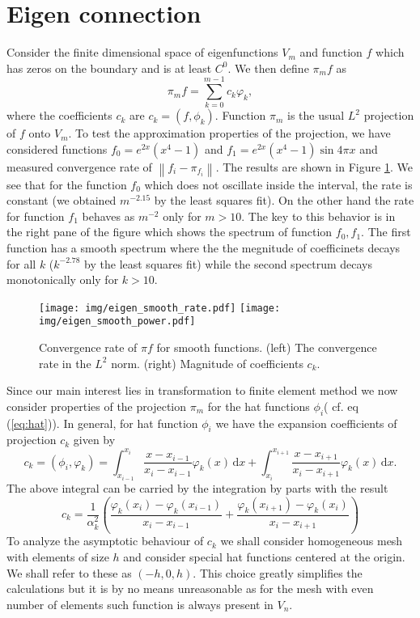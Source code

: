 \documentclass[a4paper,10pt]{article}
\newcommand{\norm}[1]{\ensuremath{\left\|#1\right\|}}
\newcommand{\inner}[2]{\ensuremath{\left(#1, #2\right)}}
\newcommand{\meas}[1]{\ensuremath{\,\mathrm{d}#1}}
\begin{document}
  \section{Eigen connection}
  Consider the finite dimensional space of eigenfunctions $V_m$ and function $f$
  which has zeros on the boundary and is at least $C^0$. We then define $\pi_m f$
  as
  \[
    \pi_m f = \displaystyle\sum\limits_{k=0}^{m-1}c_k \varphi_k,
  \]
  where the coefficients $c_k$ are $c_k=\inner{f}{\phi_k}$. Function $\pi_m$ is
  the usual $L^2$ projection of $f$ onto $V_m$. To test the approximation
  properties of the projection, we have considered functions
  $f_0=e^{2x}(x^4-1)$ and $f_1=e^{2x}(x^4-1)\sin{4\pi x}$ and measured
  convergence rate of $\norm{f_i - \pi_{f_i}}$. The results are shown in
  Figure \ref{fig:eig_smooth_projection}. We see that for the function $f_0$
  which does not oscillate inside the interval, the rate is constant (we
  obtained $m^{-2.15}$ by the least squares fit). On the other hand the rate
  for function $f_1$ behaves as $m^{-2}$ only for $m>10$. The key to this behavior
  is in the right pane of the figure which shows the spectrum of function $f_0,
  f_1$. The first function has a smooth spectrum where the the megnitude of 
  coefficinets decays for all $k$ ($k^{-2.78}$ by the least squares fit) while
  the second spectrum decays monotonically only for $k>10$.
  \begin{figure}
  \begin{center}
    \texttt{[image: img/eigen\_smooth\_rate.pdf]}
    \texttt{[image: img/eigen\_smooth\_power.pdf]}
  \end{center}
  \label{fig:eig_smooth_projection}
  \caption{Convergence rate of $\pi f$ for smooth functions. (left) The
  convergence rate in the $L^2$ norm. (right) Magnitude of coefficients $c_k$.}
  \end{figure}

  Since our main interest lies in transformation to finite element method we
  now consider properties of the projection $\pi_m$ for the hat functions
  $\phi_i$( cf. eq (\ref{eq:hat})). In general, for hat function $\phi_i$ we
  have the expansion coefficients of projection $c_k$ given by
  \[
    c_k = \inner{\phi_i}{\varphi_k} =
    \displaystyle\int_{x_{i-1}}^{x_{i}}\frac{x-x_{i-1}}{x_i-x_{i-1}}\varphi_k(x)\meas{x}+
    \displaystyle\int_{x_{i}}^{x_{i+1}}\frac{x-x_{i+1}}{x_i-x_{i+1}}\varphi_k(x)\meas{x}.
  \]
  The above integral can be carried by the integration by parts with the result
  \begin{equation}
    \label{eq:eigen_hat_ck}
    c_k =
    \frac{1}{\alpha_k^2}
    \left(
    \frac{\varphi_k(x_i) - \varphi_k(x_{i-1})}{x_i - x_{i-1}} +
    \frac{\varphi_k(x_{i+1}) - \varphi_k(x_{i})}{x_i - x_{i+1}}
    \right)
  \end{equation}
  To analyze the asymptotic behaviour of $c_k$ we shall consider homogeneous
  mesh with elements of size $h$ and consider special hat functions centered
  at the origin. We shall refer to these as $(-h, 0, h)$. This choice greatly
  simplifies the calculations but it is by no means unreasonable as for the mesh
  with even number of elements such function is always present in $V_n$.
\end{document}
